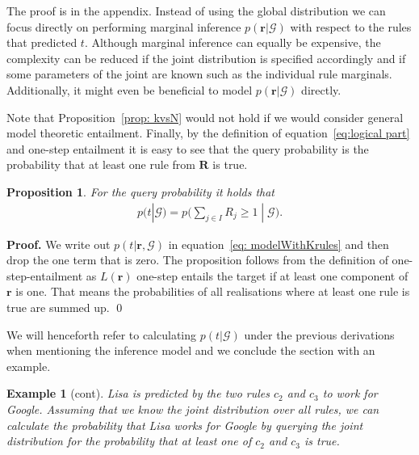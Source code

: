 \documentclass{article}
\theoremstyle{plain}
\newtheorem{proposition}[theorem]{Proposition}
\newtheorem{example}[theorem]{Example}
\theoremstyle{remark}
\newcommand{\atomrule}{c}
\newcommand{\vecallfiredrules}{\mathbf{r}}
\newcommand{\randomvecfiredrules}{\mathbf{R}}
\newcommand{\oneFiredrulRV}{R}
\newcommand{\triple}{t}
\newcommand{\alltriples}{\mathcal{G}}
\newcommand{\indexSetFired}{I}
\begin{document}
\noindent The proof is in the appendix. Instead of using the global distribution we can focus directly on performing marginal inference $p(\vecallfiredrules | \alltriples)$ with respect to the rules that predicted $\triple$. Although marginal inference can equally be expensive, the complexity can be reduced if the joint distribution is specified accordingly and if some parameters of the joint are known such as the individual rule marginals. Additionally, it might even be beneficial to model $p(\vecallfiredrules | \alltriples)$ directly. %


Note that Proposition~\eqref{prop: kvsN} would not hold if we would consider general model theoretic entailment. Finally, by the definition of equation~\eqref{eq:logical part} and one-step entailment it is easy to see that the query probability is the probability that at least one rule from $\randomvecfiredrules$ is true.

\begin{proposition} \label{prop: oneIsTrue}
    For the query probability it holds that
    \begin{align}
    p(t | \alltriples)=p\big( \sum_{j \in \indexSetFired} \oneFiredrulRV_j \geq 1 \;|\; \alltriples\big). 
    \end{align}
\end{proposition}
\textbf{Proof.} We write out $p(t |\vecallfiredrules, \alltriples)$ in equation~\eqref{eq: modelWithKrules} and then drop the one term that is zero. The proposition follows from the definition of one-step-entailment as $L(\vecallfiredrules)$ one-step entails the target if at least one component of $\vecallfiredrules$ is one. That means the probabilities of all realisations where at least one rule is true are summed up. \qed

We will henceforth refer to calculating $p(\triple | \alltriples)$ under the previous derivations when mentioning the inference model and we conclude the section with an example.

\begin{example}[cont] \label{ex:only-predicting rules example}
Lisa is predicted by the two rules $\atomrule_2$ and $\atomrule_3$ to work for Google. Assuming that we know the joint distribution over all rules, we can calculate the probability that Lisa works for Google by querying the joint distribution for the probability that at least one of $\atomrule_2$ and $\atomrule_3$ is true. 
\end{example}
\end{document}
